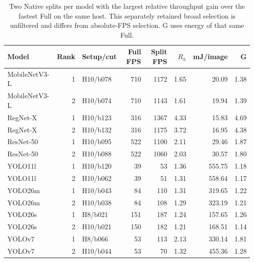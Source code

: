 \begin{table}[t]
\centering
\caption{Two Native splits per model with the largest relative throughput gain over the fastest Full on the same host. This separately retained broad selection is unfiltered and differs from absolute-FPS selection. G uses energy of that same Full.}
\label{tab:current-top2-relative}
\begingroup\small\setlength{\tabcolsep}{3pt}
\begin{tabular*}{\textwidth}{@{\extracolsep{\fill}}l r l r r r r r@{}}
\toprule
Model & Rank & Setup/cut & Full FPS & Split FPS & $R_{h}$ & mJ/image & G \\
\midrule
MobileNetV3-L & 1 & H10/b078 & 710 & 1172 & 1.65 & 20.09 & 1.38 \\
MobileNetV3-L & 2 & H10/b074 & 710 & 1143 & 1.61 & 19.94 & 1.39 \\
RegNet-X & 1 & H10/b123 & 316 & 1367 & 4.33 & 15.83 & 4.69 \\
RegNet-X & 2 & H10/b132 & 316 & 1175 & 3.72 & 16.95 & 4.38 \\
ResNet-50 & 1 & H10/b095 & 522 & 1100 & 2.11 & 29.46 & 1.87 \\
ResNet-50 & 2 & H10/b088 & 522 & 1060 & 2.03 & 30.57 & 1.80 \\
YOLO11l & 1 & H10/b120 & 39 & 53 & 1.36 & 555.75 & 1.18 \\
YOLO11l & 2 & H10/b062 & 39 & 51 & 1.31 & 558.64 & 1.17 \\
YOLO26m & 1 & H10/b043 & 84 & 110 & 1.31 & 319.65 & 1.22 \\
YOLO26m & 2 & H10/b038 & 84 & 108 & 1.29 & 323.19 & 1.21 \\
YOLO26s & 1 & H8/b021 & 151 & 187 & 1.24 & 157.65 & 1.26 \\
YOLO26s & 2 & H10/b021 & 150 & 182 & 1.21 & 168.51 & 1.14 \\
YOLOv7 & 1 & H8/b066 & 53 & 113 & 2.13 & 330.14 & 1.81 \\
YOLOv7 & 2 & H10/b044 & 53 & 70 & 1.32 & 455.36 & 1.28 \\
\bottomrule
\end{tabular*}
\endgroup
\end{table}
